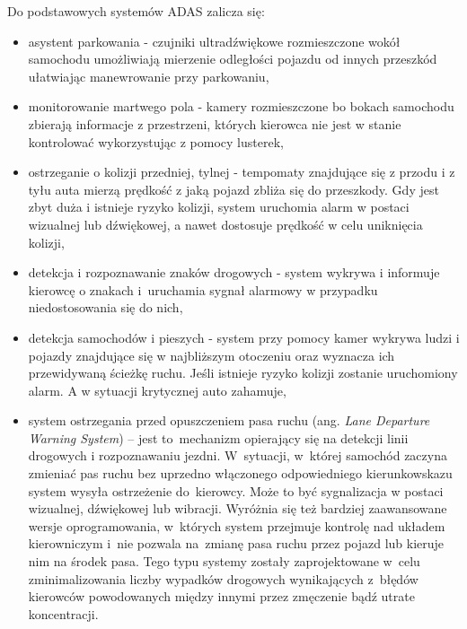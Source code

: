 Do podstawowych systemów ADAS zalicza się:
\begin{itemize}
	\item asystent parkowania - czujniki ultradźwiękowe rozmieszczone wokół samochodu umożliwiają mierzenie odległości pojazdu od innych przeszkód ułatwiając manewrowanie przy parkowaniu,
	\item monitorowanie martwego pola - kamery rozmieszczone bo bokach samochodu zbierają informacje z przestrzeni, których kierowca nie jest w stanie kontrolować wykorzystując z pomocy lusterek,
	\item ostrzeganie o kolizji przedniej, tylnej - tempomaty znajdujące się z przodu i z tyłu auta mierzą prędkość z jaką pojazd zbliża się do przeszkody. Gdy jest zbyt duża i istnieje ryzyko kolizji, system uruchomia alarm w postaci wizualnej lub dźwiękowej, a nawet dostosuje prędkość w celu uniknięcia kolizji,
	\item detekcja i rozpoznawanie znaków drogowych - system wykrywa i informuje kierowcę o znakach i~uruchamia sygnał alarmowy w przypadku niedostosowania się do nich,
	\item detekcja samochodów i pieszych - system przy pomocy kamer wykrywa ludzi i pojazdy znajdujące się w najbliższym otoczeniu oraz wyznacza ich przewidywaną ścieżkę ruchu. Jeśli istnieje ryzyko kolizji zostanie uruchomiony alarm. A w sytuacji krytycznej auto zahamuje,
	\item system ostrzegania przed opuszczeniem pasa ruchu (ang. \textit{Lane Departure Warning System}) -- jest to~mechanizm opierający się na detekcji linii drogowych i rozpoznawaniu jezdni. W~sytuacji, w~której samochód zaczyna zmieniać pas ruchu bez uprzedno włączonego odpowiedniego kierunkowskazu system wysyła ostrzeżenie do~kierowcy. Może to być sygnalizacja w postaci wizualnej, dźwiękowej lub wibracji. Wyróżnia się też bardziej zaawansowane wersje oprogramowania, w~których system przejmuje kontrolę nad układem kierowniczym i~nie pozwala na~zmianę pasa ruchu przez pojazd lub kieruje nim na środek pasa. Tego typu systemy zostały zaprojektowane w~celu zminimalizowania liczby wypadków drogowych wynikających z~błędów kierowców powodowanych między innymi przez zmęczenie bądź utrate koncentracji.
\end{itemize}

